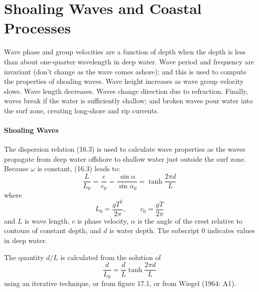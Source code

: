 \section{Shoaling Waves and Coastal Processes}
Wave phase and group velocities are a function
of depth when the depth is less than about one-quarter wavelength in
deep water. Wave period and frequency are invariant (don't change as
the wave comes ashore); and this is used to compute the properties of
shoaling waves. Wave height increases as wave group velocity
slows. Wave length decreases. Waves change direction due to
refraction. Finally, waves break if the water is sufficiently shallow;
and broken waves pour water into the surf zone, creating long-shore
and rip currents.

\paragraph{Shoaling Waves}
The dispersion relation (16.3) is used to calculate wave properties as
the waves propagate from deep water offshore to shallow water just
outside the surf zone. Because $\omega$ is constant, (16.3) leads to:
\begin{equation}
\frac{L}{L_{0}} = \frac{c}{c_{0}}=\frac{\sin \alpha }{\sin \alpha _{0}} = \tanh
\frac{2 \pi d}{L} \label{eq:intermed}
\end{equation}
where
\begin{equation}
L_{0} = \frac{g T^{2}}{2 \pi }, \qquad c_{0} = \frac{g T}{2 \pi } \label{eq:Lzero}
\end{equation}
and $L$ is wave length, $c$ is phase velocity, $\alpha $ is the angle
of the crest relative to contours of constant depth, and $d$ is water
depth. The subscript $0$ indicates values in deep water.

The quantity $d/L$ is calculated from the solution of
\begin{equation}
\frac{d}{L_{0}} = \frac{d}{L} \tanh \frac{2 \pi d}{L} \label{eq:intermediate}
\end{equation}
using an iterative technique, or from figure 17.1, or from Wiegel (1964: A1).

